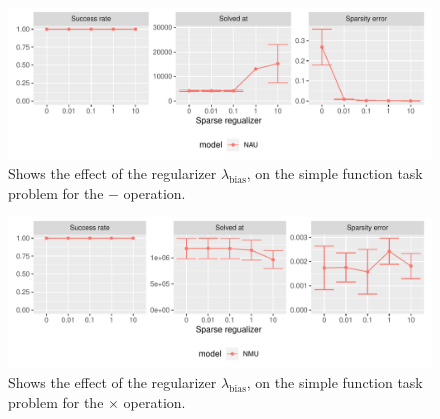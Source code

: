 \begin{figure}[h]
\centering
\includegraphics[width=\linewidth]{results/simple_function_static_regualization_sub.pdf}
\caption{Shows the effect of the regularizer $\lambda_{\mathrm{bias}}$, on the simple function task problem for the $\bm{-}$ operation.}
\label{fig:simple-fnction-static-regularizer-sub}
\end{figure}

\begin{figure}[h]
\centering
\includegraphics[width=\linewidth]{results/simple_function_static_regualization_mul.pdf}
\caption{Shows the effect of the regularizer $\lambda_{\mathrm{bias}}$, on the simple function task problem for the $\bm{\times}$ operation.}
\label{fig:simple-fnction-static-regularizer-mul}
\end{figure}

